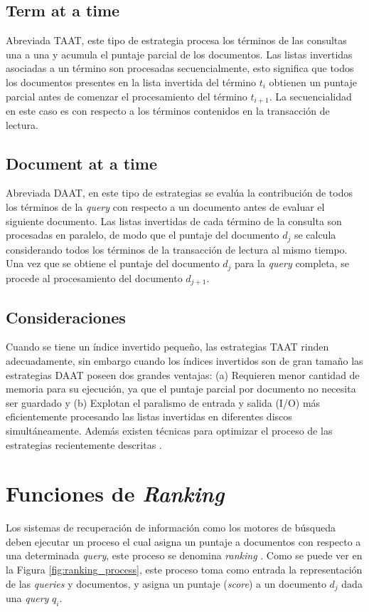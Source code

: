 \subsection{Term at a time}
Abreviada TAAT, este tipo de estrategia procesa los términos de las consultas una a una y acumula el puntaje parcial de los documentos. Las listas invertidas asociadas a un término son procesadas secuencialmente, esto significa que todos los documentos presentes en la lista invertida del término $t_{i}$ obtienen un puntaje parcial antes de comenzar el procesamiento del término $t_{i+1}$. La secuencialidad en este caso es con respecto a los términos contenidos en la transacción de lectura.

\subsection{Document at a time}
Abreviada DAAT, en este tipo de estrategias se evalúa la contribución de todos los términos de la \textit{query} con respecto a un documento antes de evaluar el siguiente documento. Las listas invertidas de cada término de la consulta son procesadas en paralelo, de modo que el puntaje del documento $d_{j}$ se calcula considerando todos los términos de la transacción de lectura al mismo tiempo. Una vez que se obtiene el puntaje del documento $d_{j}$ para la \textit{query} completa, se procede al procesamiento del documento $d_{j+1}$.

\subsection{Consideraciones}
Cuando se tiene un índice invertido pequeño, las estrategias TAAT rinden adecuadamente, sin embargo cuando los índices invertidos son de gran tamaño las estrategias DAAT poseen dos grandes ventajas: (a) Requieren menor cantidad de memoria para su ejecución, ya que el puntaje parcial por documento no necesita ser guardado y (b) Explotan el paralismo de entrada y salida (I/O) más eficientemente procesando las listas invertidas en diferentes discos simultáneamente. Además existen técnicas para optimizar el proceso de las estrategias recientemente descritas \citep{Turtle:1995}.



\section{Funciones de \textit{Ranking}}
\label{marco:ranking}
Los sistemas de recuperación de información como los motores de búsqueda deben ejecutar un proceso el cual asigna un puntaje a documentos con respecto a una determinada \textit{query}, este proceso se denomina \textit{ranking} \citep{Baeza-Yates:2011}. Como se puede ver en la Figura \ref{fig:ranking_process}, este proceso toma como entrada la representación de las \textit{queries} y documentos, y asigna un puntaje (\textit{score}) a un documento $d_{j}$ dada una \textit{query} $q_{i}$.

